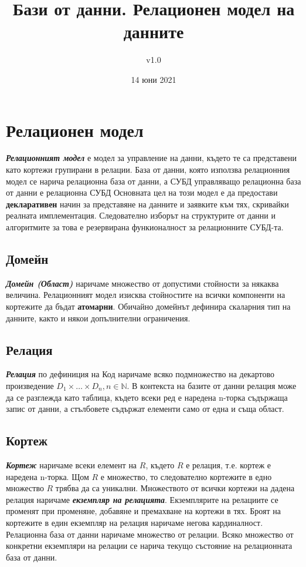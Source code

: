\documentclass[fleqn,12pt]{article}
\title{Бази от данни. Релационен модел на данните}
\author{v1.0}
\date{14 юни 2021}
\begin{document}
\maketitle

\tableofcontents
\pagebreak

\section{Релационен модел}

\textit{\textbf{Релационният модел}} е модел за управление на данни, където те са представени като кортежи групирани в релации.
База от данни, която използва релационния модел се нарича релационна база от данни, а СУБД управляващо релационна база от данни е релационна СУБД
\bigbreak
Основната цел на този модел е да предостави \textbf{декларативен} начин за представяне на данните и заявките към тях, скривайки реалната имплементация.
Следователно изборът на структурите от данни и алгоритмите за това е резервирана функионалност за релационните СУБД-та.

\subsection{Домейн}

\textbf{\textit{Домейн (Област)}} наричаме множество от допустими стойности за някаква величина.
\bigbreak
Релационният модел изисква стойностите на всички компоненти на кортежите да бъдат \textbf{атомарни}.
Обичайно домейнът дефинира скаларния тип на данните, както и някои допълнителни ограничения.

\subsection{Релация}

\textbf{\textit{Релация}} по дефиниция на Код наричаме всяко подмножество на декартово произведение $D_1 \times \dots \times D_n, n \in \mathbb{N}$.
В контекста на базите от данни релация може да се разглежда като таблица, където всеки ред е наредена n-торка съдържаща запис от данни, а стълбовете съдържат елементи само от една и съща област.

\subsection{Кортеж}

\textbf{\textit{Кортеж}} наричаме всеки елемент на $R$, където $R$ е релация, т.е. кортеж е наредена n-торка.
Щом $R$ е множество, то следователно кортежите в едно множество $R$ трябва да са уникални.
\bigbreak
Множеството от всички кортежи на дадена релация наричаме \textit{\textbf{екземпляр на релацията}}.
Екземплярите на релациите се променят при променяне, добавяне и премахване на кортежи в тях.
Броят на кортежите в един екземпляр на релация наричаме негова кардиналност.
\bigbreak
Релационна база от данни наричаме множество от релации.
Всяко множество от конкретни екземпляри на релации се нарича текущо състояние на релационната база от данни.
\end{document}
